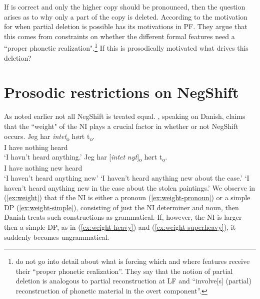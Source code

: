 \documentclass[12pt, letterpaper]{article}
\begin{document}
\z 
If \citet{chomskyMinimalistProgramLinguistic1993} is correct and only the higher copy should be pronounced, then the question arises as to why only a part of the copy is deleted. According to \citet{fanselowRemarksEconomyPronunciation2001,fanselowDistributedDeletion2002} the motivation for when partial deletion is possible has its motivations in PF. They argue that this comes from constraints on whether the different formal features need a ``proper phonetic realization".\footnote{\citet{fanselowRemarksEconomyPronunciation2001,fanselowDistributedDeletion2002} do not go into detail about what is forcing which and where features receive their ``proper phonetic realization''. They say that the notion of partial deletion is analogous to partial reconstruction at LF and ``involve[s] (partial) reconstruction of phonetic material in the overt component''.} If this is prosodically motivated what drives this deletion?

\section{Prosodic restrictions on NegShift} \label{sec:PROSODY}

As noted earlier not all NegShift is treated equal. \citet[65f]{christensenInterfacesNegationSyntax2005}, speaking on Danish, claims that the ``weight" of the NI plays a crucial factor in whether or not NegShift occurs. 
	\ea \label{ex:weight}
		\ea \label{ex:weight-pronoun}
		{\gll Jeg har \textit{intet}\textsubscript{o} hørt t\textsubscript{o}.\\
		I have nothing heard\\}
		\glt  `I havn't heard anything.'
		\ex \label{ex:weight-simple}
		\gll Jeg har [\textit{intet} \textit{nyt}]\textsubscript{o} hørt t\textsubscript{o}.\\
		I have nothing new heard\\
		\glt `I haven't heard anything new'
		\glt `I haven't heard anything new about the case.' \label{ex:weight-heavy}
		\glt `I haven't heard anything new in the case about the stolen paintings.' \label{ex:weight-superheavy}
		\z 
	\z
We observe in (\ref{ex:weight}) that if the NI is either a pronoun (\ref{ex:weight-pronoun}) or a simple DP (\ref{ex:weight-simple}), consisting of just the NI determiner and noun, then Danish treats such constructions as grammatical. If, however, the NI is larger then a simple DP, as in (\ref{ex:weight-heavy}) and (\ref{ex:weight-superheavy}), it suddenly becomes ungrammatical. 
\end{document}
